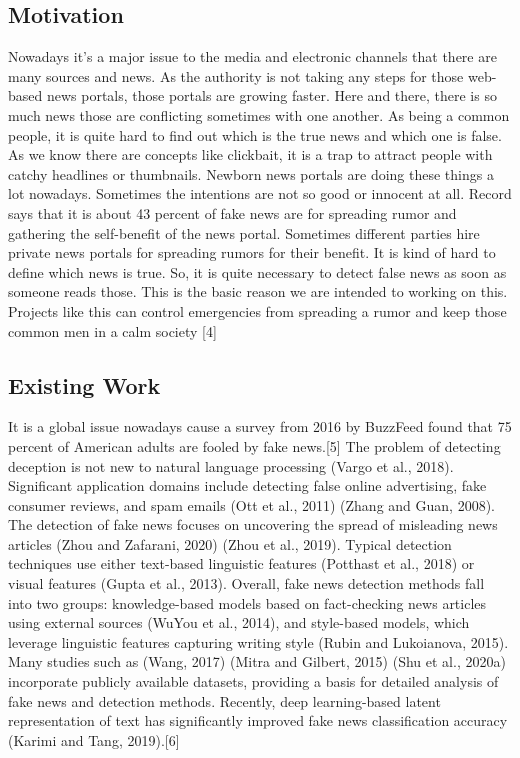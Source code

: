 \documentclass[conference]{IEEEtran}
\begin{document}
\subsection{Motivation}
Nowadays it’s a major issue to the media and electronic channels that there are many sources and news. As the authority is not taking any steps for those web-based news portals, those portals are growing faster. Here and there, there is so much news those are conflicting sometimes with one another. As being a common people, it is quite hard to find out which is the true news and which one is false. As we know there are concepts like clickbait, it is a trap to attract people with catchy headlines or thumbnails. Newborn news portals are doing these things a lot nowadays. Sometimes the intentions are not so good or innocent at all. Record says that it is about 43 percent  of fake news are for spreading rumor and gathering the self-benefit of the news portal. Sometimes different parties hire private news portals for spreading rumors for their benefit. It is kind of hard to define which news is true. So, it is quite necessary to detect false news as soon as someone reads those. This is the basic reason we are intended to working on this. Projects like this can control emergencies from spreading a rumor and keep those common men in a calm society [4]

\subsection{Existing Work}
It is a global issue nowadays cause a survey from 2016 by BuzzFeed found that 75 percent of American adults are fooled by fake news.[5] The problem of detecting deception is not new to natural language processing (Vargo et al., 2018). Significant application domains include detecting false online advertising, fake consumer reviews, and spam emails (Ott et al., 2011) (Zhang and Guan, 2008). The detection of fake news focuses on uncovering the spread of misleading news articles (Zhou and Zafarani, 2020) (Zhou et al., 2019). Typical detection techniques use either text-based linguistic features (Potthast et al., 2018) or visual features (Gupta et al., 2013). Overall, fake news detection methods fall into two groups: knowledge-based models based on fact-checking news articles using external sources (WuYou et al., 2014), and style-based models, which leverage linguistic features capturing writing style (Rubin and Lukoianova, 2015). Many studies such as (Wang, 2017) (Mitra and Gilbert, 2015) (Shu et al., 2020a) incorporate publicly available datasets, providing a basis for detailed analysis of fake news and detection methods. Recently, deep learning-based latent representation of text has significantly improved fake news classification accuracy (Karimi and Tang, 2019).[6] 
 
\end{document}
